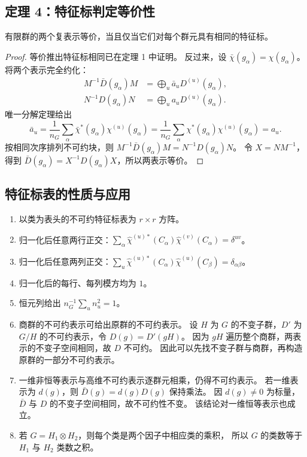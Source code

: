 \subsection{定理 4：特征标判定等价性}
\begin{theorem}
有限群的两个复表示等价，当且仅当它们对每个群元具有相同的特征标。
\end{theorem}
\begin{proof}
等价推出特征标相同已在定理 1 中证明。
反过来，设 $\bar\chi\left(g_\alpha\right)=\chi\left(g_\alpha\right)$。将两个表示完全约化：
\begin{align}
M^{-1}\bar D\left(g_\alpha\right)M&=\bigoplus_u\bar a_uD^{\left(u\right)}\left(g_\alpha\right),\\
N^{-1}D\left(g_\alpha\right)N&=\bigoplus_u a_uD^{\left(u\right)}\left(g_\alpha\right).
\end{align}
唯一分解定理给出
\begin{equation}
\bar a_u=\frac1{n_G}\sum_\alpha\bar\chi^*\left(g_\alpha\right)\chi^{\left(u\right)}\left(g_\alpha\right)
=\frac1{n_G}\sum_\alpha\chi^*\left(g_\alpha\right)\chi^{\left(u\right)}\left(g_\alpha\right)=a_u.
\end{equation}
按相同次序排列不可约块，则 $M^{-1}\bar D\left(g_\alpha\right)M=N^{-1}D\left(g_\alpha\right)N$。
令 $X=NM^{-1}$，得到 $\bar D\left(g_\alpha\right)=X^{-1}D\left(g_\alpha\right)X$，所以两表示等价。
\end{proof}

\subsection{特征标表的性质与应用}
\begin{enumerate}
\item 以类为表头的不可约特征标表为 $r\times r$ 方阵。
\item 归一化后任意两行正交：$\sum_\alpha\hat\chi^{\left(u\right)*}\left(C_\alpha\right)\hat\chi^{\left(v\right)}\left(C_\alpha\right)=\delta^{uv}$。
\item 归一化后任意两列正交：$\sum_u\hat\chi^{\left(u\right)*}\left(C_\alpha\right)\hat\chi^{\left(u\right)}\left(C_\beta\right)=\delta_{\alpha\beta}$。
\item 归一化后的每行、每列模方均为 $1$。
\item 恒元列给出 $n_G^{-1}\sum_u n_u^2=1$。
\item 商群的不可约表示可给出原群的不可约表示。
设 $H$ 为 $G$ 的不变子群，$D'$ 为 $G/H$ 的不可约表示，令 $D\left(g\right)=D'\left(gH\right)$。
因为 $gH$ 遍历整个商群，两表示的不变子空间相同，故 $D$ 不可约。
因此可以先找不变子群与商群，再构造原群的一部分不可约表示。
\item 一维非恒等表示与高维不可约表示逐群元相乘，仍得不可约表示。
若一维表示为 $d\left(g\right)$，则 $\bar D\left(g\right)=d\left(g\right)D\left(g\right)$ 保持乘法。
因 $d\left(g\right)\ne0$ 为标量，$\bar D$ 与 $D$ 的不变子空间相同，故不可约性不变。
该结论对一维恒等表示也成立。
\item 若 $G=H_1\otimes H_2$，则每个类是两个因子中相应类的乘积，
所以 $G$ 的类数等于 $H_1$ 与 $H_2$ 类数之积。
\end{enumerate}


